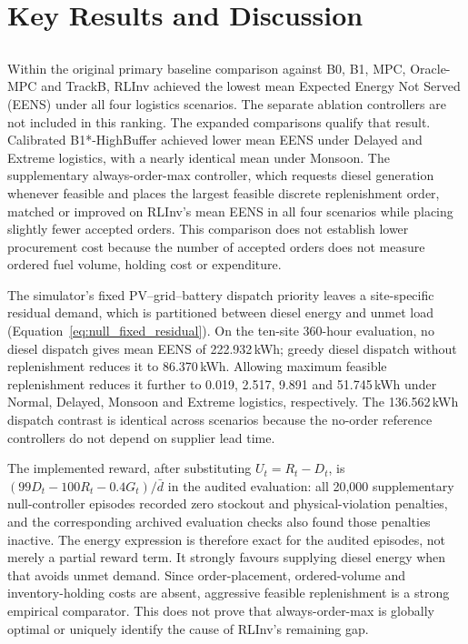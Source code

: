 \section{Key Results and Discussion}
\label{sec:conclusion_results}

\subsection{}

\begin{revisedblock}
Within the original primary baseline comparison
against B0, B1, MPC, Oracle-MPC and TrackB,
RLInv achieved the lowest mean Expected Energy
Not Served (EENS) under all four logistics
scenarios. The separate ablation controllers
are not included in this ranking. The expanded
comparisons qualify that result.
Calibrated B1*-HighBuffer achieved lower mean EENS under
Delayed and Extreme logistics, with a nearly identical mean
under Monsoon. The supplementary always-order-max controller,
which requests diesel generation whenever feasible and places
the largest feasible discrete replenishment order, matched or
improved on RLInv's mean EENS in all four scenarios while
placing slightly fewer accepted orders. This comparison does
not establish lower procurement cost because the number of
accepted orders does not measure ordered fuel volume,
holding cost or expenditure.

The simulator's fixed PV--grid--battery dispatch priority
leaves a site-specific residual demand, which is partitioned
between diesel energy and unmet load
(Equation~\ref{eq:null_fixed_residual}). On the ten-site
360-hour evaluation, no diesel dispatch gives mean EENS of
222.932\,kWh; greedy diesel dispatch without replenishment
reduces it to 86.370\,kWh. Allowing maximum feasible
replenishment reduces it further to 0.019, 2.517, 9.891
and 51.745\,kWh under Normal, Delayed, Monsoon and Extreme
logistics, respectively. The 136.562\,kWh dispatch contrast
is identical across scenarios because the no-order reference
controllers do not depend on supplier lead time.

The implemented reward, after substituting
$U_t=R_t-D_t$, is
$(99D_t-100R_t-0.4G_t)/\bar d$ in the audited evaluation:
all 20,000 supplementary null-controller episodes recorded
zero stockout and physical-violation penalties, and the
corresponding archived evaluation checks also found those
penalties inactive. The energy expression is therefore exact
for the audited episodes, not merely a partial reward term.
It strongly favours supplying diesel energy when that avoids
unmet demand. Since order-placement, ordered-volume and
inventory-holding costs are absent, aggressive feasible
replenishment is a strong empirical comparator. This does not
prove that always-order-max is globally optimal or uniquely
identify the cause of RLInv's remaining gap.


\end{revisedblock}
